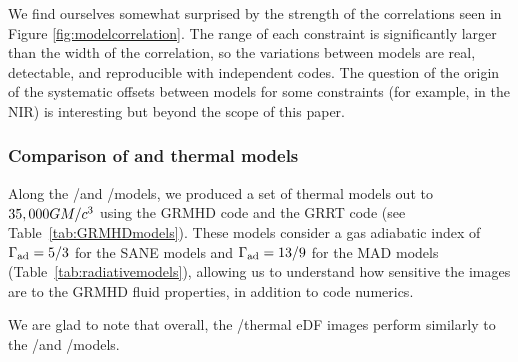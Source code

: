 We find ourselves somewhat surprised by the strength of the correlations seen in Figure \ref{fig:modelcorrelation}.  The range of each constraint is significantly larger than the width of the correlation, so the variations between models are real, detectable, and reproducible with independent codes.  The question of the origin of the systematic offsets between models for some constraints (for example, in the NIR) is interesting but beyond the scope of this paper.   


\subsubsection{Comparison of \hamr and \kharma thermal models}

Along the \kharma/\ipole and \bhac/\bhoss models, we produced a set of thermal models out to $35,000GM/c^3$ using the GRMHD code \hamr and the GRRT code \bhoss (see Table~\ref{tab:GRMHDmodels}). These models consider a gas adiabatic index of $\Gamma_{\rm ad}=5/3$ for the SANE models and $\Gamma_{\rm ad}=13/9$ for the MAD models (Table~\ref{tab:radiativemodels}), allowing us to understand how sensitive the images are to the GRMHD fluid properties, in addition to code numerics. 

We are glad to note that overall, the \hamr/\bhoss thermal eDF images perform similarly to the \kharma/\ipole and \bhac/\bhoss models. 


